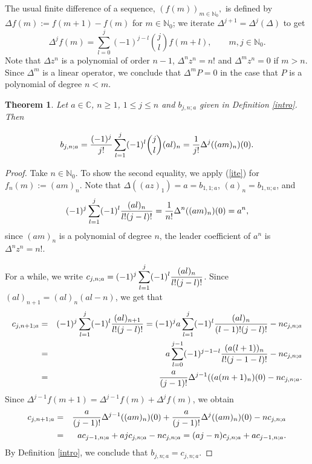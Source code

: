 \documentclass[a4paper,12pt]{amsart}
\def\NN{\mathbb N}
\def\CC{\mathbb C}
\def\CC{\mathbb C}
\newtheorem{theorem}[thm]{Theorem}
\theoremstyle{definition}
\theoremstyle{remark}
\begin{document}
The usual finite difference of a sequence, $(f(m))_{m\in \NN_0},$ is defined by $\Delta f(m) :=f(m +1)-f(m)$ for $m\in \NN_0$; we iterate $\Delta^{j+1}= \Delta^j(\Delta)$ to get
\begin{equation}\label{ite}
\Delta^jf(m)=\sum_{l=0}^j(-1)^{j-l} {j\choose l}f(m+l), \qquad m,j\in \NN_0.\end{equation}
Note that $\Delta z^n$ is a polynomial of order $n-1$, $\Delta^nz^n=n!$ and $\Delta^mz^n=0$ if $m>n.$ Since $\Delta^m$ is a linear operator, we conclude that $\Delta^m P=0$ in the case that $P$ is a polynomial of degree $n<m.$
\begin{theorem} Let $a\in \CC$, $n\ge 1$,  $1\le j\le n$ and $b_{j,n;a}$ given in Definition \ref{intro}. Then

$$
b_{j,n;a}= {(-1)^j\over j!}\sum_{l=1}^j(-1)^l  {j\choose l} {(al)_n}={1\over j!}\Delta^j((am)_n)(0).
$$
\end{theorem}
\begin{proof} Take $n\in \NN_0$. To show the second equality, we apply (\ref{ite}) for $f_n(m):=(am)_n$. Note that $\Delta((az)_1)=a= b_{1,1;a}$, $(a)_n=b_{1,n;a}$, and
$$
(-1)^j\sum_{l=1}^j(-1)^l{(al)_n\over l!(j-l)!}={1\over n!}\Delta^n((am)_n)(0)=a^n,
$$
since $(am)_n$ is a polynomial of degree $n$,   the leader coefficient of  $a^n$ is $\Delta^nz^n=n!$.

For a while, we write $c_{j,n;a}= \displaystyle{(-1)^j\sum_{l=1}^j(-1)^l{(al)_n\over l!(j-l)!}}$.  Since $(al)_{n+1}=(al)_n(al-n)$, we get that
\begin{eqnarray*}
c_{j,n+1;a}&=& (-1)^j\sum_{l=1}^j(-1)^l{(al)_{n+1}\over l!(j-l)!}=(-1)^ja\sum_{l=1}^j(-1)^l{(al)_{n}\over (l-1)!(j-l)!}-nc_{j,n;a}\\
&=&a\sum_{l=0}^{j-1}(-1)^{j-1-l}{(a(l+1))_{n}\over l!(j-1-l)!}-nc_{j,n;a}\\&=&{a\over (j-1)!}\Delta^{j-1}((a(m+1)_n)(0)-nc_{j,n;a}.
\end{eqnarray*}
Since $\Delta^{j-1}f(m+1)=\Delta^{j-1}f(m)+\Delta^{j}f(m) $, we obtain
\begin{eqnarray*}
c_{j,n+1;a}&=&{a\over (j-1)!}\Delta^{j-1}((am)_n)(0)+{a\over (j-1)!}\Delta^{j}((am)_n)(0)-nc_{j,n;a}\\
&=&ac_{j-1,n;a}+ajc_{j,n;a}-nc_{j,n;a}=(aj-n)c_{j,n;a}+ac_{j-1,n;a}.
\end{eqnarray*}
By Definition \ref{intro}, we conclude that $b_{j,n;a}= c_{j,n;a}$.
    \end{proof}
\end{document}
